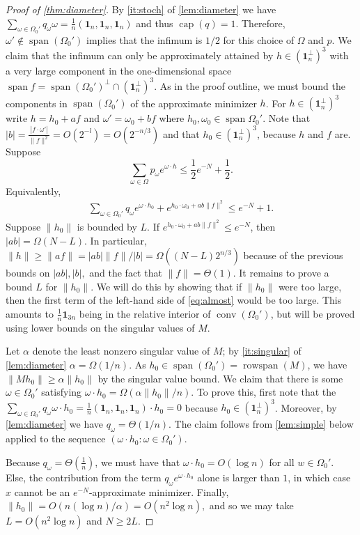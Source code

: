 \documentclass[10pt,a4paper]{article}
\numberwithin{equation}{section}
\DeclareMathOperator{\conv}{conv}
\DeclareMathOperator{\capa}{cap}
\DeclareMathOperator{\spn}{span}
\newcommand{\id}{\mathbf{1}}
\newcommand{\norm}[1]{\lVert#1\rVert}
\begin{document}
\begin{proof}[Proof of \cref{thm:diameter}]
By \cref{it:stoch} of \cref{lem:diameter} we have $\sum_{\omega \in \Omega_0'} q_\omega \omega = \frac{1}{n}(\id_n, \id_n, \id_n)$ and thus $\capa(q) = 1$. Therefore, $\omega' \not\in \spn(\Omega_0')$ implies that the infimum is $1/2$ for this choice of $\Omega$ and $p$. We claim that the infimum can only be approximately attained by $h \in (\id_n^\perp)^3$ with a very large component in the one-dimensional space $\spn f = \spn(\Omega_0')^\perp \cap (\id_n^\perp)^3$. As in the proof outline, we must bound the components in $\spn(\Omega_0')$ of the approximate minimizer $h$. For $h \in (\id_n^\perp)^3$ write $h = h_0 + a f$ and $\omega' = \omega_0 + bf$ where $h_0, \omega_0 \in \spn \Omega_0'$. Note that $|b| = \frac{|f \cdot \omega'|}{\|f\|^2} = O(2^{-l}) =  O(2^{-n/3})$ and that $h_0 \in (\id_n^\perp)^3$, because $h$ and $f$ are.
Suppose 
$$ \sum_{\omega \in \Omega} p_{\omega} e^{\omega \cdot h} \leq \frac{1}{2}e^{-N} + \frac{1}{2}.$$
Equivalently, 
\begin{align}
 \sum_{\omega \in \Omega_0'} q_{\omega} e^{\omega \cdot h_0} +  e^{h_0\cdot \omega_0 + a b \norm{f}^2} \leq e^{-N} + 1.\label{eq:almost}
\end{align}
Suppose $\|h_0\|$ is bounded by $L$. If $e^{h_0\cdot \omega_0 + ab \norm{f}^2 } \leq e^{-N}$, then $|a b| =  \Omega(N - L)$. In particular, $\|h\| \geq \|af\| =\vert a b \vert \|f\| / \vert b \vert= \Omega ((N - L)2^{n/3})$ because of the previous bounds on $|ab|, |b|,$ and the fact that $\|f\| = \Theta(1)$. It remains to prove a bound $L$ for $\|h_0\|$. We will do this by showing that if $\|h_0\|$ were too large, then the first term of the left-hand side of \cref{eq:almost} would be too large. This amounts to $\frac{1}{n}\id_{3n}$ being in the relative interior of $\conv(\Omega_0')$, but will be proved using lower bounds on the singular values of $M$.

Let $\alpha$ denote the least nonzero singular value of $M$; by \cref{it:singular} of \cref{lem:diameter} $\alpha = \Omega( 1/n)$. As $h_0 \in \spn(\Omega_0') =\operatorname{rowspan}(M)$, we have $\|M h_0\| \geq \alpha \|h_0\|$ by the singular value bound. We claim that there is some $\omega \in \Omega_0'$ satisfying $\omega \cdot h_0 = \Omega(\alpha \|h_0\|/n)$. To prove this, first note that the $\sum_{\omega \in \Omega_0'} q_{\omega} \omega \cdot h_0 = \frac{1}{n}(\id_n, \id_n, \id_n) \cdot h_0 = 0$ because $h_0 \in  (\id_n^\perp)^3$. Moreover, by \cref{lem:diameter} we have $q_{\omega} = \Theta(1/n)$. The claim follows from \cref{lem:simple} below applied to the sequence $(\omega \cdot h_0: \omega \in \Omega_0').$


Because $q_\omega=\Theta(\frac{1}{n})$, we must have that $\omega \cdot h_0 = O(\log n)$ for all $w \in \Omega_0'$. Else, the contribution from the term $q_\omega e^{\omega \cdot h_0}$ alone is larger than $1$, in which case $x$ cannot be an $e^{- N}$-approximate minimizer. Finally, $\|h_0\| = O(n(\log n)/\alpha) = O(n^{2}\log n),$ and so we may take $L = O(n^{2}\log n)$ and $N \geq 2L$. \end{proof}
\end{document}
